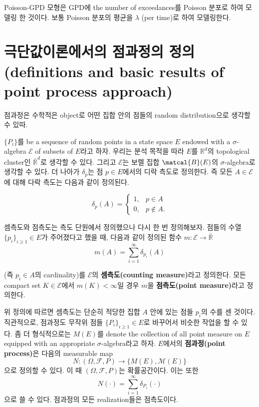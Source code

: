 \documentclass[b5paper,]{scrbook}
\theoremstyle{plain}
\theoremstyle{definition}
\numberwithin{equation}{section}
\let\BeginKnitrBlock\begin \let\EndKnitrBlock\end
\begin{document}
Poisson-GPD 모형은 GPD에 the number of exceedances를 Poisson 분포로 하여 모델링 한 것이다. 보통 Poisson 분포의 평균을 \(\lambda\) (per time)로 하여 모델링한다.

\hypertarget{--definitions-and-basic-results-of-point-process-approach}{%
\section{극단값이론에서의 점과정의 정의(definitions and basic results of point process approach)}\label{--definitions-and-basic-results-of-point-process-approach}}

점과정은 수학적은 object로 어떤 집합 안의 점들의 random distribution으로 생각할 수 있따.

\(\{P_{i}\}\)를 be a sequence of random points in a state space \(E\) endowed with a \(\sigma\)-algebra \(\mathcal{E}\) of subsets of \(E\)라고 하자. 우리는 분석 목적을 따라 \(E\)를 \(\mathbb{R}^{d}\)의 topological cluster인 \(\bar{\mathbb{R}}^{d}\)로 생각할 수 있다. 그리고 \(\mathcal{E}\)는 보렐 집합 \(\matcal{B}(E)\)의 \(\sigma\)-algebra로 생각할 수 있다. 더 나아가 \(\delta_{p}\)는 점 \(p\in E\)에서의 디락 측도로 정의한다. 즉 모든 \(A\in\mathcal{E}\)에 대해 다락 측도는 다음과 같이 정의된다.

\[
\delta_{p}(A)=
\begin{cases}
1, & p\in A\\
0, & p\notin A.
\end{cases}
\]

\BeginKnitrBlock{definition}[셈측도와 점측도]
\protect\hypertarget{def:unnamed-chunk-453}{}{\label{def:unnamed-chunk-453} {} }셈측도와 점측도는 측도 단원에서 정의했으나 다시 한 번 정의해보자. 점들의 수열 \(\{p_{i}\}_{i\geq 1}\in E\)가 주어졌다고 했을 때, 다음과 같이 정의된 함수 \(m:\mathcal{E}\rightarrow\bar{\mathbb{R}}\)
\[m(A) = \sum_{i=1}^{\infty}\delta_{p_{i}}(A)\]

(즉 \(p_{i}\in A\)의 cardinality)를 \(\mathcal{E}\)의 \textbf{셈측도(counting measure)}라고 정의한다. 모든 compact set \(K\in\mathcal{E}\)에서 \(m(K)<\infty\)일 경우 \(m\)을 \textbf{점측도(point measure)}라고 정의한다.
\EndKnitrBlock{definition}

위 정의에 따르면 셈측도는 단순히 적당한 집합 \(A\) 안에 있는 점들 \(p_{i}\)의 수를 센 것이다. 직관적으로, 점과정도 무작위 점들 \(\{P_{i}\}_{i\geq 1}\in E\)로 바꾸어서 비슷한 작업을 할 수 있다. 좀 더 형식적으로는 \(M(E)\)를 denote the collection of all point measure on \(E\) equipped with an appropriate \(\sigma\)-algebra라고 하자. \(E\)에서의 \textbf{점과정(point process)}은 다음의 measurable map
\[N:(\Omega, \mathcal{F}, P)\rightarrow \{ M(E), \mathcal{M}(E)\}\]
으로 정의할 수 있다. 이 때 \((\Omega, \mathcal{F}, P)\)는 확률공간이다. 이는 또한
\[N(\cdot) = \sum_{i=1}^{\infty}\delta_{P_{i}}(\cdot)\]
으로 쓸 수 있다. 점과정의 모든 realization들은 점측도이다.
\end{document}
